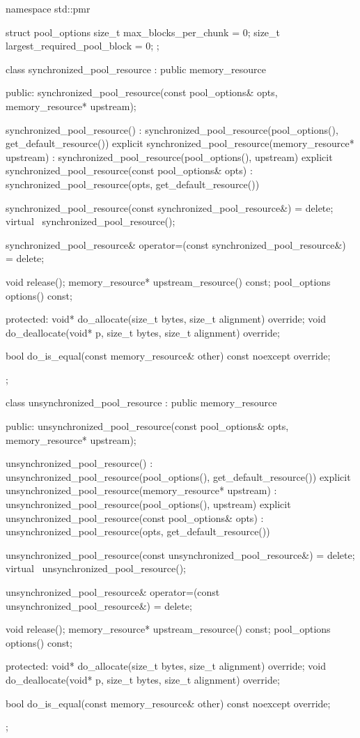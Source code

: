 %
%
%
\begin{codeblock}
namespace std::pmr {
  struct pool_options {
    size_t max_blocks_per_chunk = 0;
    size_t largest_required_pool_block = 0;
  };

  class synchronized_pool_resource : public memory_resource {
  public:
    synchronized_pool_resource(const pool_options& opts, memory_resource* upstream);

    synchronized_pool_resource()
      : synchronized_pool_resource(pool_options(), get_default_resource()) {}
    explicit synchronized_pool_resource(memory_resource* upstream)
      : synchronized_pool_resource(pool_options(), upstream) {}
    explicit synchronized_pool_resource(const pool_options& opts)
      : synchronized_pool_resource(opts, get_default_resource()) {}

    synchronized_pool_resource(const synchronized_pool_resource&) = delete;
    virtual ~synchronized_pool_resource();

    synchronized_pool_resource& operator=(const synchronized_pool_resource&) = delete;

    void release();
    memory_resource* upstream_resource() const;
    pool_options options() const;

  protected:
    void* do_allocate(size_t bytes, size_t alignment) override;
    void do_deallocate(void* p, size_t bytes, size_t alignment) override;

    bool do_is_equal(const memory_resource& other) const noexcept override;
  };

  class unsynchronized_pool_resource : public memory_resource {
  public:
    unsynchronized_pool_resource(const pool_options& opts, memory_resource* upstream);

    unsynchronized_pool_resource()
      : unsynchronized_pool_resource(pool_options(), get_default_resource()) {}
    explicit unsynchronized_pool_resource(memory_resource* upstream)
      : unsynchronized_pool_resource(pool_options(), upstream) {}
    explicit unsynchronized_pool_resource(const pool_options& opts)
      : unsynchronized_pool_resource(opts, get_default_resource()) {}

    unsynchronized_pool_resource(const unsynchronized_pool_resource&) = delete;
    virtual ~unsynchronized_pool_resource();

    unsynchronized_pool_resource& operator=(const unsynchronized_pool_resource&) = delete;

    void release();
    memory_resource* upstream_resource() const;
    pool_options options() const;

  protected:
    void* do_allocate(size_t bytes, size_t alignment) override;
    void do_deallocate(void* p, size_t bytes, size_t alignment) override;

    bool do_is_equal(const memory_resource& other) const noexcept override;
  };
}
\end{codeblock}

